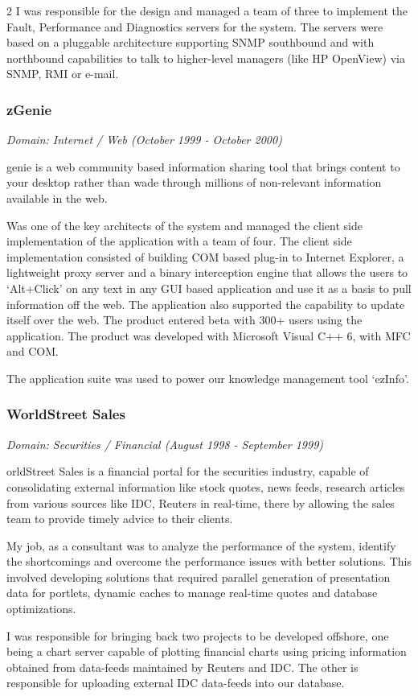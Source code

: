 \documentclass[a4paper,11pt]{article}
\newcommand\cvprojectentry[5]{
  \subsubsection*{#1}
  
  \vspace{-7pt}
  
  \it{Domain: #2}\normalfont{} \quad (#3 - #4)
  
}
\begin{document}
\begin{multicols}{2}
I was responsible for the design and managed a team of three to
implement the Fault, Performance and Diagnostics servers for the
system. The servers were based on a pluggable architecture supporting
SNMP southbound and with northbound capabilities to talk to
higher-level managers (like HP OpenView) via SNMP, RMI or e-mail.
 
\cvprojectentry{zGenie}{Internet / Web}{October 1999}{October 2000}

Zgenie is a web community based information sharing tool that brings
content to your desktop rather than wade through millions of
non-relevant information available in the web.
 
Was one of the key architects of the system and managed the client
side implementation of the application with a team of four. The client
side implementation consisted of building COM based plug-in to
Internet Explorer, a lightweight proxy server and a binary
interception engine that allows the users to `Alt+Click' on any text
in any GUI based application and use it as a basis to pull information
off the web. The application also supported the capability to update
itself over the web. The product entered beta with 300+ users using
the application. The product was developed with Microsoft Visual C++
6, with MFC and COM.
 
The application suite was used to power our knowledge management tool
`ezInfo'.
 
\cvprojectentry{WorldStreet Sales}{Securities / Financial}{August 1998}{September 1999}

 
WorldStreet Sales is a financial portal for the securities industry,
capable of consolidating external information like stock quotes, news
feeds, research articles from various sources like IDC, Reuters in
real-time, there by allowing the sales team to provide timely advice to
their clients.
 
My job, as a consultant was to analyze the performance of the system,
identify the shortcomings and overcome the performance issues with
better solutions. This involved developing solutions that required
parallel generation of presentation data for portlets, dynamic caches
to manage real-time quotes and database optimizations.
 
I was responsible for bringing back two projects to be developed
offshore, one being a chart server capable of plotting financial
charts using pricing information obtained from data-feeds maintained
by Reuters and IDC. The other is responsible for uploading external
IDC data-feeds into our database.
 

\end{multicols}
\end{document}
